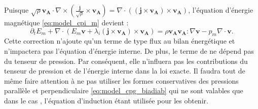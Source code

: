  Puisque $\sqrt{\rho} \boldsymbol{v_A} \cdot \nabla \times \left(\frac{\boldsymbol{j}}{\sqrt{\rho}}  \times \boldsymbol{v_A}\right) = \nabla \cdot \left(\left(\boldsymbol{j}  \times \boldsymbol{v_A}\right)\times \boldsymbol{v_A} \right)$, l'équation d'énergie magnétique \eqref{eq:model_cpi_m} devient :
\begin{equation}
  \label{eq:model_cpgh_m}   \partial_t E_m  +\nabla   \cdot  \left(E_m\boldsymbol{v}+ \lambda_i \left(\boldsymbol{j}  \times \boldsymbol{v_A}\right)\times \boldsymbol{v_A} \right)  = \rho  \boldsymbol{v_A}\boldsymbol{v_A}  : \nabla \boldsymbol{v}- p_m  \nabla \cdot \boldsymbol{v} .
\end{equation}
 Cette correction n'ajoute qu'un terme de type flux au bilan énergétique et n'impactera pas l'équation d'énergie interne. De plus, le terme de  ne dépend pas du tenseur de pression. Par conséquent, elle n'influera pas les contributions du tenseur de pression et de l'énergie interne dans la loi exacte. Il faudra tout de même faire attention à ne pas utiliser les formes conservatives des pressions parallèle et perpendiculaire  \eqref{eq:model_cpg_biadiab} qui ne sont valables que dans le cas , l'équation d'induction  étant utilisée pour les obtenir.

